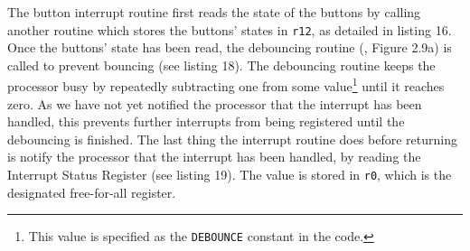 The button interrupt routine first reads the state of the buttons by calling another routine which stores the buttons' states in \texttt{r12}, as detailed in listing 16.
Once the buttons' state has been read, the debouncing routine (\cite{lab-compendium}, Figure 2.9a) is called to prevent bouncing (see listing 18).
The debouncing routine keeps the processor busy by repeatedly subtracting one from some value\footnote{This value is specified as the \texttt{DEBOUNCE} constant in the code.} until it reaches zero. As we have not yet notified the processor that the interrupt has been handled, this prevents further interrupts from being registered until the debouncing is finished.
The last thing the interrupt routine does before returning is notify the processor that the interrupt has been handled, by reading the Interrupt Status Register (see listing 19).
The value is stored in \texttt{r0}, which is the designated free-for-all register.
